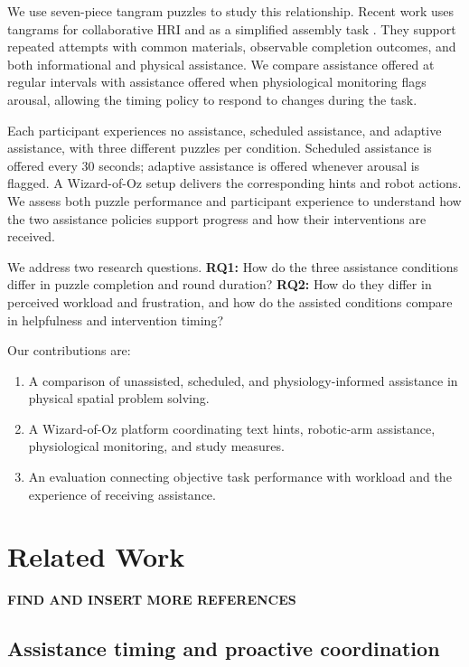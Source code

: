 \documentclass[sigconf,anonymous,balance=false]{aamas} %
\begin{document}
We use seven-piece tangram puzzles to study this relationship. Recent work uses tangrams for collaborative HRI and as a simplified assembly task \cite{tabatabaei2025,melo2026}. They support repeated attempts with common materials, observable completion outcomes, and both informational and physical assistance. We compare assistance offered at regular intervals with assistance offered when physiological monitoring flags arousal, allowing the timing policy to respond to changes during the task.

Each participant experiences no assistance, scheduled assistance, and adaptive assistance, with three different puzzles per condition. Scheduled assistance is offered every 30 seconds; adaptive assistance is offered whenever arousal is flagged. A Wizard-of-Oz setup delivers the corresponding hints and robot actions. We assess both puzzle performance and participant experience to understand how the two assistance policies support progress and how their interventions are received.

We address two research questions. \textbf{RQ1:} How do the three assistance conditions differ in puzzle completion and round duration? \textbf{RQ2:} How do they differ in perceived workload and frustration, and how do the assisted conditions compare in helpfulness and intervention timing?

Our contributions are:

\begin{enumerate}
\item A comparison of unassisted, scheduled, and physiology-informed assistance in physical spatial problem solving.
\item A Wizard-of-Oz platform coordinating text hints, robotic-arm assistance, physiological monitoring, and study measures.
\item An evaluation connecting objective task performance with workload and the experience of receiving assistance.
\end{enumerate}

\section{Related Work}

\textbf{FIND AND INSERT MORE REFERENCES}

\subsection{Assistance timing and proactive coordination}
\end{document}
